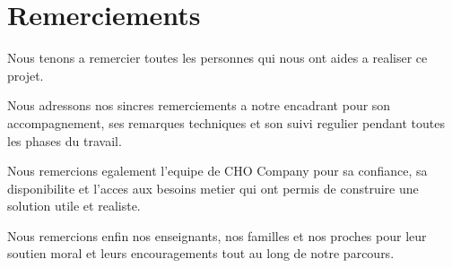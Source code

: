 \chapter*{Remerciements}

Nous tenons a remercier toutes les personnes qui nous ont aides a realiser ce projet.

Nous adressons nos sincres remerciements a notre encadrant pour son accompagnement, ses remarques techniques et son suivi regulier pendant toutes les phases du travail.

Nous remercions egalement l'equipe de CHO Company pour sa confiance, sa disponibilite et l'acces aux besoins metier qui ont permis de construire une solution utile et realiste.

Nous remercions enfin nos enseignants, nos familles et nos proches pour leur soutien moral et leurs encouragements tout au long de notre parcours.

\clearpage
